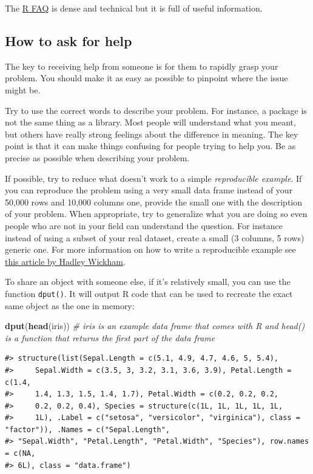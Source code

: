 \documentclass[]{book}
\newenvironment{Shaded}{\begin{snugshade}}{\end{snugshade}}
\newcommand{\KeywordTok}[1]{\textcolor[rgb]{0.13,0.29,0.53}{\textbf{#1}}}
\newcommand{\CommentTok}[1]{\textcolor[rgb]{0.56,0.35,0.01}{\textit{#1}}}
\newcommand{\NormalTok}[1]{#1}
\theoremstyle{definition}
\theoremstyle{definition}
\theoremstyle{definition}
\theoremstyle{remark}
\begin{document}
The \href{http://cran.r-project.org/doc/FAQ/R-FAQ.html}{R FAQ} is dense
and technical but it is full of useful information.

\subsection{How to ask for help}\label{how-to-ask-for-help}

The key to receiving help from someone is for them to rapidly grasp your
problem. You should make it as easy as possible to pinpoint where the
issue might be.

Try to use the correct words to describe your problem. For instance, a
package is not the same thing as a library. Most people will understand
what you meant, but others have really strong feelings about the
difference in meaning. The key point is that it can make things
confusing for people trying to help you. Be as precise as possible when
describing your problem.

If possible, try to reduce what doesn't work to a simple
\emph{reproducible example}. If you can reproduce the problem using a
very small data frame instead of your 50,000 rows and 10,000 columns
one, provide the small one with the description of your problem. When
appropriate, try to generalize what you are doing so even people who are
not in your field can understand the question. For instance instead of
using a subset of your real dataset, create a small (3 columns, 5 rows)
generic one. For more information on how to write a reproducible example
see \href{http://adv-r.had.co.nz/Reproducibility.html}{this article by
Hadley Wickham}.

To share an object with someone else, if it's relatively small, you can
use the function \texttt{dput()}. It will output R code that can be used
to recreate the exact same object as the one in memory:

\begin{Shaded}
\begin{Highlighting}[]
\KeywordTok{dput}\NormalTok{(}\KeywordTok{head}\NormalTok{(iris)) }\CommentTok{# iris is an example data frame that comes with R and head() is a function that returns the first part of the data frame}
\end{Highlighting}
\end{Shaded}

\begin{verbatim}
#> structure(list(Sepal.Length = c(5.1, 4.9, 4.7, 4.6, 5, 5.4), 
#>     Sepal.Width = c(3.5, 3, 3.2, 3.1, 3.6, 3.9), Petal.Length = c(1.4, 
#>     1.4, 1.3, 1.5, 1.4, 1.7), Petal.Width = c(0.2, 0.2, 0.2, 
#>     0.2, 0.2, 0.4), Species = structure(c(1L, 1L, 1L, 1L, 1L, 
#>     1L), .Label = c("setosa", "versicolor", "virginica"), class = "factor")), .Names = c("Sepal.Length", 
#> "Sepal.Width", "Petal.Length", "Petal.Width", "Species"), row.names = c(NA, 
#> 6L), class = "data.frame")
\end{verbatim}
\end{document}
